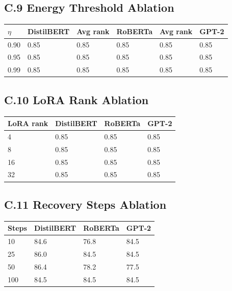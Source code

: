\subsection{C.9 Energy Threshold Ablation}

\begin{table}[H]
\centering
\small
\begin{tabular}{llllll}
\toprule
\textbf{$\eta$} & \textbf{DistilBERT} & \textbf{Avg rank} & \textbf{RoBERTa} & \textbf{Avg rank} & \textbf{GPT-2} \\
\midrule
0.90 & 0.85 & 0.85 & 0.85 & 0.85 & 0.85 \\
0.95 & 0.85 & 0.85 & 0.85 & 0.85 & 0.85 \\
0.99 & 0.85 & 0.85 & 0.85 & 0.85 & 0.85 \\
\bottomrule
\end{tabular}
\end{table}

\subsection{C.10 LoRA Rank Ablation}

\begin{table}[H]
\centering
\small
\begin{tabular}{llll}
\toprule
\textbf{LoRA rank} & \textbf{DistilBERT} & \textbf{RoBERTa} & \textbf{GPT-2} \\
\midrule
4 & 0.85 & 0.85 & 0.85 \\
8 & 0.85 & 0.85 & 0.85 \\
16 & 0.85 & 0.85 & 0.85 \\
32 & 0.85 & 0.85 & 0.85 \\
\bottomrule
\end{tabular}
\end{table}

\subsection{C.11 Recovery Steps Ablation}

\begin{table}[H]
\centering
\small
\begin{tabular}{llll}
\toprule
\textbf{Steps} & \textbf{DistilBERT} & \textbf{RoBERTa} & \textbf{GPT-2} \\
\midrule
10 & 84.6 & 76.8 & 84.5 \\
25 & 86.0 & 84.5 & 84.5 \\
50 & 86.4 & 78.2 & 77.5 \\
100 & 84.5 & 84.5 & 84.5 \\
\bottomrule
\end{tabular}
\end{table}

